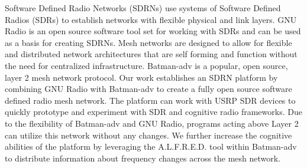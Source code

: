 Software Defined Radio Networks (SDRNs)  use systems of Software Defined Radios (SDRs) to establish
networks with flexible physical and link layers. GNU Radio is an open source software
tool set for working with SDRs and can be used as a basis for creating SDRNs.
Mesh networks are designed to allow for flexible and 
distributed network architectures that are self forming and function without
the need for centralized infrastructure. Batman-adv is a popular, open source, layer 2 mesh network
protocol. Our work establishes an SDRN platform by combining GNU Radio with Batman-adv to create a fully open
source software defined radio mesh network. The platform can work with USRP SDR devices to quickly
prototype and experiment with SDR and cognitive radio frameworks. Due to the flexibility of Batman-adv
and GNU Radio, programs acting above Layer 2 can utilize this network without any changes. We further
increase the cognitive abilities of the platform by leveraging the A.L.F.R.E.D. tool within Batman-adv
to distribute information about frequency changes across the mesh network.  

